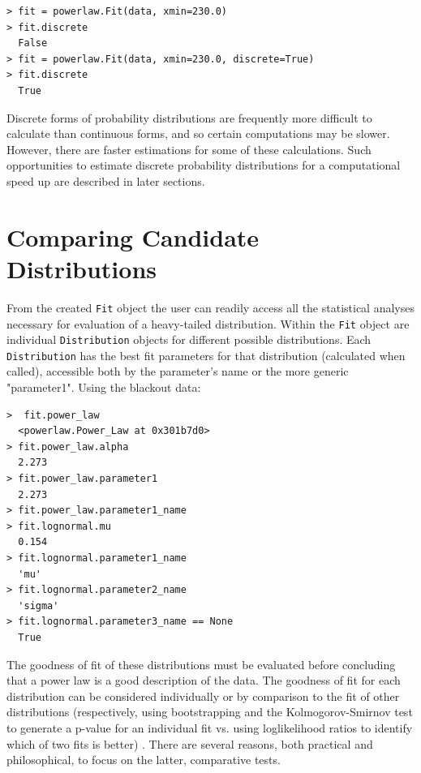\documentclass[10pt]{article}
\begin{document}
\begin{verbatim}
> fit = powerlaw.Fit(data, xmin=230.0)
> fit.discrete
  False
> fit = powerlaw.Fit(data, xmin=230.0, discrete=True)
> fit.discrete 
  True
\end{verbatim}

Discrete forms of probability distributions are frequently more difficult to calculate than continuous forms, and so certain computations may be slower. However, there are faster estimations for some of these calculations. Such opportunities to estimate discrete probability distributions for a computational speed up are described in later sections.

\section*{Comparing Candidate Distributions}
From the created \verb"Fit" object the user can readily access all the statistical analyses necessary for evaluation of a heavy-tailed distribution. Within the \verb"Fit" object are individual \verb"Distribution" objects for different possible distributions. Each \verb"Distribution" has the best fit parameters for that distribution (calculated when called), accessible both by the parameter's name or the more generic "parameter1". Using the blackout data:

\begin{verbatim}
>  fit.power_law
  <powerlaw.Power_Law at 0x301b7d0>
> fit.power_law.alpha
  2.273
> fit.power_law.parameter1
  2.273 
> fit.power_law.parameter1_name
> fit.lognormal.mu
  0.154
> fit.lognormal.parameter1_name
  'mu'
> fit.lognormal.parameter2_name
  'sigma'
> fit.lognormal.parameter3_name == None
  True
\end{verbatim}

The goodness of fit of these distributions must be evaluated before concluding that a power law is a good description of the data. The goodness of fit for each distribution can be considered individually or by comparison to the fit of other distributions (respectively, using bootstrapping and the Kolmogorov-Smirnov test to generate a p-value for an individual fit vs. using loglikelihood ratios to identify which of two fits is better) \cite{Clauset2009}. There are several reasons, both practical and philosophical, to focus on the latter, comparative tests. 
\end{document}
